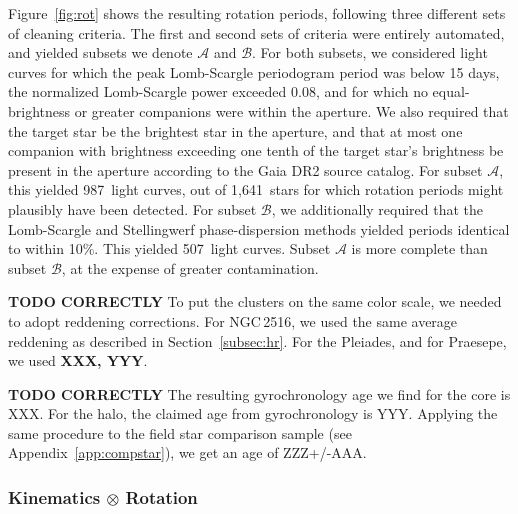 \documentclass[12pt,twocolumn,tighten]{aastex63}
\newcommand{\cn}{NGC\,2516} %
\newcommand{\nautorotdenominator}{1{,}641\ } %
\newcommand{\nautorotnumerator}{987\ } %
\newcommand{\nautorotnumeratormatching}{507\ } %
\begin{document}
Figure~\ref{fig:rot} shows the resulting rotation periods, following
three different sets of cleaning criteria.  The first and second sets
of criteria were entirely automated, and yielded subsets we denote
$\mathcal{A}$ and $\mathcal{B}$.  For both subsets, we considered
light curves for which the peak Lomb-Scargle periodogram period was
below 15 days, the normalized Lomb-Scargle power exceeded 0.08, and
for which no equal-brightness or greater companions were within the
aperture.  We also required that the target star be the brightest star
in the aperture, and that at most one companion with brightness
exceeding one tenth of the target star's brightness be present in the
aperture according to the Gaia DR2 source catalog.  For subset
$\mathcal{A}$, this yielded \nautorotnumerator light curves, out of
\nautorotdenominator stars for which rotation periods might plausibly
have been detected.  For subset $\mathcal{B}$, we additionally
required that the Lomb-Scargle and Stellingwerf phase-dispersion
methods yielded periods identical to within 10\%.  This yielded
\nautorotnumeratormatching light curves.
Subset $\mathcal{A}$ is more complete than 
subset $\mathcal{B}$, at the expense of greater contamination.

{\bf TODO CORRECTLY}
To put the clusters on the same color scale, we needed to adopt
reddening corrections.
For \cn, we used the same average reddening as described in
Section~\ref{subsec:hr}.
For the Pleiades, and for Praesepe, we used {\bf XXX, YYY}.

{\bf TODO CORRECTLY}
The resulting gyrochronology age we find for the core is XXX.
For the halo, the claimed age from gyrochronology is YYY.
Applying the same procedure to the field star comparison sample (see
Appendix~\ref{app:compstar}),
we get an age of ZZZ+/-AAA.

\subsubsection{Kinematics $\otimes$ Rotation}
\end{document}
